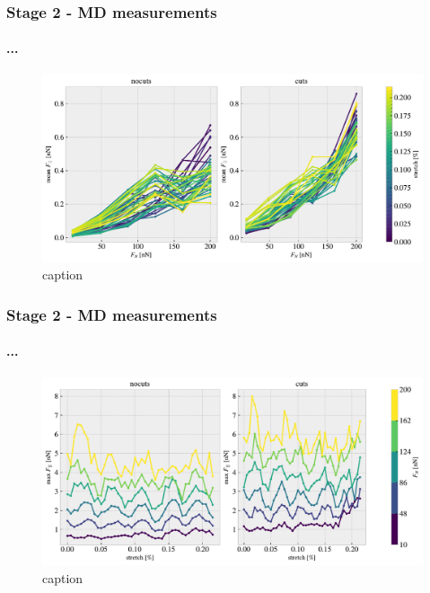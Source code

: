 \documentclass[
	10pt, %
]{beamer}
\begin{document}

	


\begin{frame}
	\frametitle{Stage 2 - MD measurements}
	\framesubtitle{...}
	\begin{figure}
		\includegraphics[width=\linewidth]{figures/multi0.pdf}
		\caption{caption}
	\end{figure}	
\end{frame}

\begin{frame}
	\frametitle{Stage 2 - MD measurements}
	\framesubtitle{...}
	\begin{figure}
		\includegraphics[width=\linewidth]{figures/multi1.pdf}
		\caption{caption}
	\end{figure}	
\end{frame}
\end{document}
